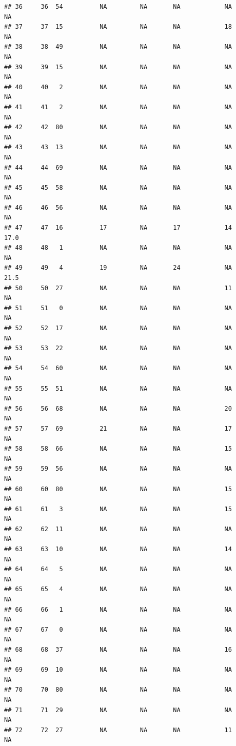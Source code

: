 \documentclass[man]{apa6}
\begin{document}
\begin{verbatim}
## 36     36  54          NA         NA       NA            NA       NA
## 37     37  15          NA         NA       NA            18       NA
## 38     38  49          NA         NA       NA            NA       NA
## 39     39  15          NA         NA       NA            NA       NA
## 40     40   2          NA         NA       NA            NA       NA
## 41     41   2          NA         NA       NA            NA       NA
## 42     42  80          NA         NA       NA            NA       NA
## 43     43  13          NA         NA       NA            NA       NA
## 44     44  69          NA         NA       NA            NA       NA
## 45     45  58          NA         NA       NA            NA       NA
## 46     46  56          NA         NA       NA            NA       NA
## 47     47  16          17         NA       17            14     17.0
## 48     48   1          NA         NA       NA            NA       NA
## 49     49   4          19         NA       24            NA     21.5
## 50     50  27          NA         NA       NA            11       NA
## 51     51   0          NA         NA       NA            NA       NA
## 52     52  17          NA         NA       NA            NA       NA
## 53     53  22          NA         NA       NA            NA       NA
## 54     54  60          NA         NA       NA            NA       NA
## 55     55  51          NA         NA       NA            NA       NA
## 56     56  68          NA         NA       NA            20       NA
## 57     57  69          21         NA       NA            17       NA
## 58     58  66          NA         NA       NA            15       NA
## 59     59  56          NA         NA       NA            NA       NA
## 60     60  80          NA         NA       NA            15       NA
## 61     61   3          NA         NA       NA            15       NA
## 62     62  11          NA         NA       NA            NA       NA
## 63     63  10          NA         NA       NA            14       NA
## 64     64   5          NA         NA       NA            NA       NA
## 65     65   4          NA         NA       NA            NA       NA
## 66     66   1          NA         NA       NA            NA       NA
## 67     67   0          NA         NA       NA            NA       NA
## 68     68  37          NA         NA       NA            16       NA
## 69     69  10          NA         NA       NA            NA       NA
## 70     70  80          NA         NA       NA            NA       NA
## 71     71  29          NA         NA       NA            NA       NA
## 72     72  27          NA         NA       NA            11       NA

\end{verbatim}
\end{document}

